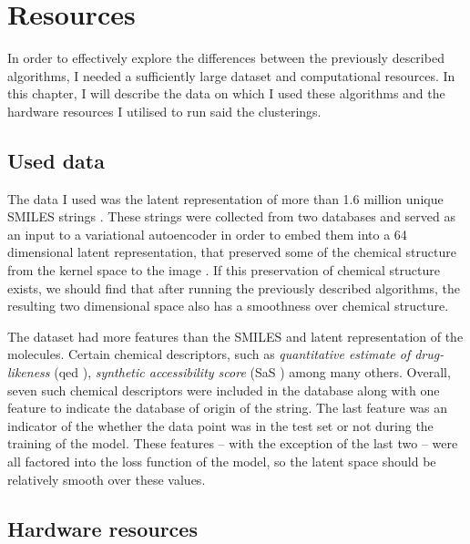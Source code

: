 \chapter{Resources}\label{ch:resources}

In order to effectively explore the differences between the previously described algorithms, I needed a sufficiently large dataset and computational resources. In this chapter, I will describe the data on which I used these algorithms and the hardware resources I utilised to run said the clusterings.

\section{Used data}\label{sec:used-data}

The data I used was the latent representation of more than 1.6 million unique SMILES strings \cite{bib:smiles}. These strings were collected from two databases and served as an input to a variational autoencoder in order to embed them into a 64 dimensional latent representation, that preserved some of the chemical structure from the kernel space to the image \cite{bib:thesis}. If this preservation of chemical structure exists, we should find that after running the previously described algorithms, the resulting two dimensional space also has a smoothness over chemical structure.

The dataset had more features than the SMILES and latent representation of the molecules. Certain chemical descriptors, such as \textit{quantitative estimate of drug-likeness} (qed \cite{bib:qed}), \textit{synthetic accessibility score} (SaS \cite{bib:sas}) among many others. Overall, seven such chemical descriptors were included in the database along with one feature to indicate the database of origin of the string. The last feature was an indicator of the whether the data point was in the test set or not during the training of the model. These features -- with the exception of the last two -- were all factored into the loss function of the model, so the latent space should be relatively smooth over these values.

\section{Hardware resources}\label{sec:hardware-resources}

